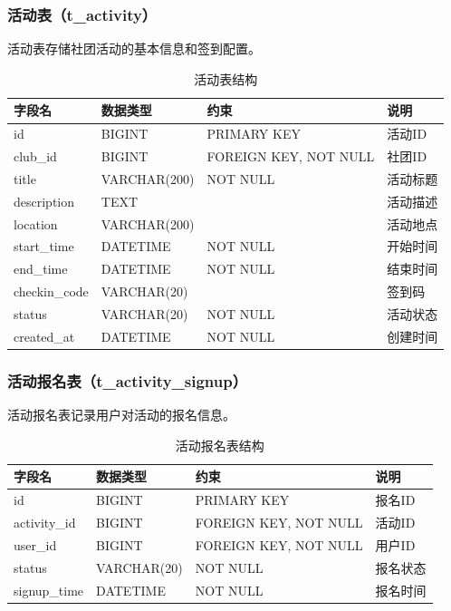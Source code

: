 \subsubsection{活动表（t\_activity）}

活动表存储社团活动的基本信息和签到配置。

\begin{table}[H]
\centering
\caption{活动表结构}
\begin{tabular}{llll}
\toprule
字段名 & 数据类型 & 约束 & 说明 \\
\midrule
id & BIGINT & PRIMARY KEY & 活动ID \\
club\_id & BIGINT & FOREIGN KEY, NOT NULL & 社团ID \\
title & VARCHAR(200) & NOT NULL & 活动标题 \\
description & TEXT & & 活动描述 \\
location & VARCHAR(200) & & 活动地点 \\
start\_time & DATETIME & NOT NULL & 开始时间 \\
end\_time & DATETIME & NOT NULL & 结束时间 \\
checkin\_code & VARCHAR(20) & & 签到码 \\
status & VARCHAR(20) & NOT NULL & 活动状态 \\
created\_at & DATETIME & NOT NULL & 创建时间 \\
\bottomrule
\end{tabular}
\end{table}

\subsubsection{活动报名表（t\_activity\_signup）}

活动报名表记录用户对活动的报名信息。

\begin{table}[H]
\centering
\caption{活动报名表结构}
\begin{tabular}{llll}
\toprule
字段名 & 数据类型 & 约束 & 说明 \\
\midrule
id & BIGINT & PRIMARY KEY & 报名ID \\
activity\_id & BIGINT & FOREIGN KEY, NOT NULL & 活动ID \\
user\_id & BIGINT & FOREIGN KEY, NOT NULL & 用户ID \\
status & VARCHAR(20) & NOT NULL & 报名状态 \\
signup\_time & DATETIME & NOT NULL & 报名时间 \\
\bottomrule
\end{tabular}
\end{table}

